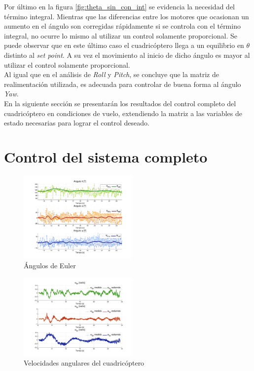 \documentclass[main]{subfiles}
\begin{document}
Por último en la figura \ref{fig:theta_sin_con_int} se evidencia la necesidad del término integral. Mientras que las diferencias entre los motores que ocasionan un aumento en el ángulo son corregidas rápidamente si se controla con el término integral, no ocurre lo mismo al utilizar un control solamente proporcional. Se puede observar que en este último caso el cuadricóptero llega a un equilibrio en $\theta$ distinto al \emph{set point}. A su vez el movimiento al inicio de dicho ángulo es mayor al utilizar el control solamente proporcional.\\

Al igual que en el análisis de \emph{Roll} y \emph{Pitch}, se concluye que la matriz de realimentación utilizada, es adecuada para controlar de buena forma al ángulo \emph{Yaw}. \\

En la siguiente sección se presentarán los resultados del control completo del cuadricóptero en condiciones de vuelo, extendiendo la matriz a las variables de estado necesarias para lograr el control deseado.

\section{Control del sistema completo}

\begin{figure}
	\centering
	\vspace{-10pt}
	\includegraphics[width=0.52\textwidth]{./pics_test_control/euler.pdf}
	\caption{Ángulos de Euler}
	\label{fig:euler}
\end{figure}

\begin{figure}
	\centering
	\vspace{-10pt}
	\includegraphics[width=0.52\textwidth]{./pics_test_control/wq.pdf}
	\caption{Velocidades angulares del cuadricóptero}
	\label{fig:wq}
\end{figure}
\end{document}
